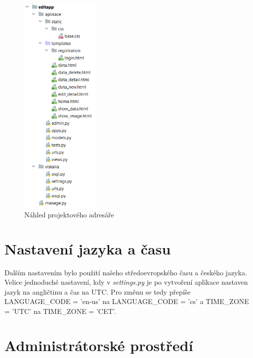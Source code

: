 \begin{figure}[H] \centering
    \includegraphics[width=110pt]{./pictures/7-nahled-adresare.PNG}
    \caption[Náhled projektového adresáře]{Náhled projektového adresáře}
	\label{fig:Náhled projektového adresáře}              
\end{figure}

\section{Nastavení jazyka a času}

Dalším nastavením bylo použití našeho středoevropského času a českého
jazyka. Velice jednoduché nastavení, kdy v \emph{settings.py} je po
vytvoření aplikace nastaven jazyk na angličtinu a čas na UTC. Pro
změnu se tedy přepíše LANGUAGE\_CODE = 'en-us' na
LANGUAGE\_CODE = 'cs' a TIME\_ZONE = 'UTC' na
TIME\_ZONE = 'CET'.

\newpage

\section{Administrátorské prostředí}

